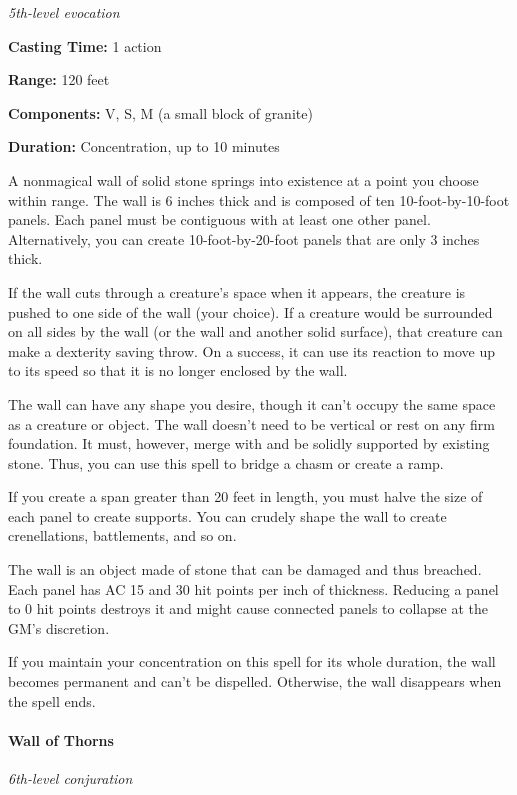 \documentclass[
]{article}
\begin{document}
\emph{5th-level evocation}

\textbf{Casting Time:} 1 action

\textbf{Range:} 120 feet

\textbf{Components:} V, S, M (a small block of granite)

\textbf{Duration:} Concentration, up to 10 minutes

A nonmagical wall of solid stone springs into existence at a point you
choose within range. The wall is 6 inches thick and is composed of ten
10-foot-by-10-foot panels. Each panel must be contiguous with at least
one other panel. Alternatively, you can create 10-foot-by-20-foot panels
that are only 3 inches thick.

If the wall cuts through a creature's space when it appears, the
creature is pushed to one side of the wall (your choice). If a creature
would be surrounded on all sides by the wall (or the wall and another
solid surface), that creature can make a dexterity saving throw. On a
success, it can use its reaction to move up to its speed so that it is
no longer enclosed by the wall.

The wall can have any shape you desire, though it can't occupy the same
space as a creature or object. The wall doesn't need to be vertical or
rest on any firm foundation. It must, however, merge with and be solidly
supported by existing stone. Thus, you can use this spell to bridge a
chasm or create a ramp.

If you create a span greater than 20 feet in length, you must halve the
size of each panel to create supports. You can crudely shape the wall to
create crenellations, battlements, and so on.

The wall is an object made of stone that can be damaged and thus
breached. Each panel has AC 15 and 30 hit points per inch of thickness.
Reducing a panel to 0 hit points destroys it and might cause connected
panels to collapse at the GM's discretion.

If you maintain your concentration on this spell for its whole duration,
the wall becomes permanent and can't be dispelled. Otherwise, the wall
disappears when the spell ends.

\hypertarget{wall-of-thorns}{%
\paragraph{Wall of Thorns}\label{wall-of-thorns}}

\emph{6th-level conjuration}
\end{document}
